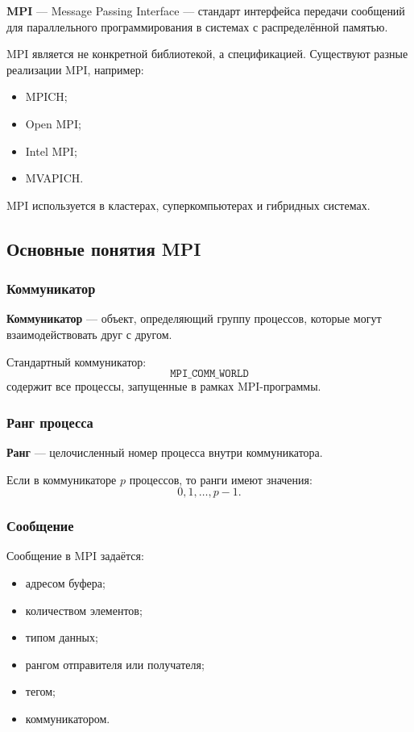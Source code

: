 \documentclass[12pt,a4paper]{article}
\begin{document}
\textbf{MPI} --- Message Passing Interface --- стандарт интерфейса передачи сообщений для параллельного программирования в системах с распределённой памятью.

MPI является не конкретной библиотекой, а спецификацией. Существуют разные реализации MPI, например:
\begin{itemize}
    \item MPICH;
    \item Open MPI;
    \item Intel MPI;
    \item MVAPICH.
\end{itemize}

MPI используется в кластерах, суперкомпьютерах и гибридных системах.

\subsection{Основные понятия MPI}

\subsubsection{Коммуникатор}

\textbf{Коммуникатор} --- объект, определяющий группу процессов, которые могут взаимодействовать друг с другом.

Стандартный коммуникатор:
\[
\texttt{MPI\_COMM\_WORLD}
\]
содержит все процессы, запущенные в рамках MPI-программы.

\subsubsection{Ранг процесса}

\textbf{Ранг} --- целочисленный номер процесса внутри коммуникатора.

Если в коммуникаторе $p$ процессов, то ранги имеют значения:
\[
0,1,\ldots,p-1.
\]

\subsubsection{Сообщение}

Сообщение в MPI задаётся:
\begin{itemize}
    \item адресом буфера;
    \item количеством элементов;
    \item типом данных;
    \item рангом отправителя или получателя;
    \item тегом;
    \item коммуникатором.
\end{itemize}
\end{document}
